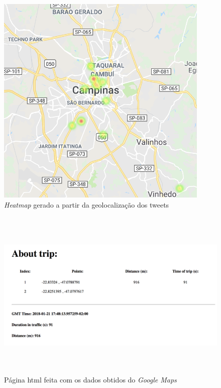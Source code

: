\begin{figure}[h!]
    \centering
    \includegraphics[height=10.2cm]{imagens/heatmap.png}
    \caption{\emph{Heatmap} gerado a partir da geolocalização dos tweets}
    \label{fig:heatmap}
\end{figure}

\begin{figure}[h!]
    \centering
    \includegraphics[height=8.2cm]{imagens/pagina.png}
    \caption{Página html feita com os dados obtidos do \emph{Google Maps}}
    \label{fig:pagina}
\end{figure}

